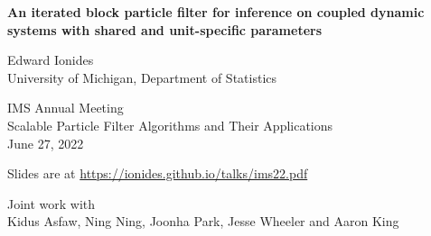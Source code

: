 \documentclass{beamer}
\begin{document}
\begin{frame}
  
\begin{center}
  {\Large\bf An iterated block particle filter for inference on coupled dynamic systems with shared and unit-specific parameters}


\vspace{2mm}

Edward Ionides\\
University of Michigan, Department of Statistics

\vspace{8mm}

IMS Annual Meeting\\
Scalable Particle Filter Algorithms and Their Applications
\\
June 27, 2022


\hspace{3mm}

Slides are at \url{https://ionides.github.io/talks/ims22.pdf}

\vspace{8mm}

Joint work with\\
Kidus Asfaw, Ning Ning, Joonha Park, Jesse Wheeler and Aaron King

\end{center}

\end{frame}


\newcommand\challengeSep{\vspace{3mm}}
\end{document}
